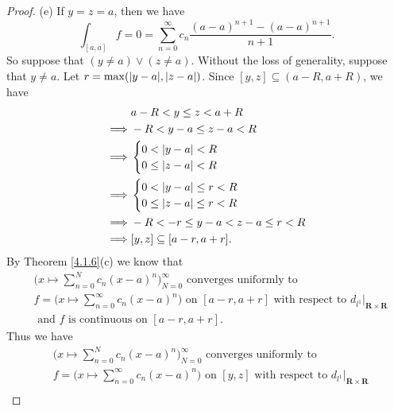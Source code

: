 \begin{proof}{(e)}
    If \(y = z = a\), then we have
    \[
        \int_{[a, a]} f = 0 = \sum_{n = 0}^\infty c_n \frac{(a - a)^{n + 1} - (a - a)^{n + 1}}{n + 1}.
    \]
    So suppose that \((y \neq a) \lor (z \neq a)\).
    Without the loss of generality, suppose that \(y \neq a\).
    Let \(r = \max(\abs*{y - a}, \abs*{z - a})\).
    Since \([y, z] \subseteq (a - R, a + R)\), we have
    \begin{align*}
                 & a - R < y \leq z < a + R              \\
        \implies & -R < y - a \leq z - a < R             \\
        \implies & \begin{cases}
                       0 < \abs*{y - a} < R \\
                       0 \leq \abs*{z - a} < R
                   \end{cases}                \\
        \implies & \begin{cases}
                       0 < \abs*{y - a} \leq r < R \\
                       0 \leq \abs*{z - a} \leq r < R
                   \end{cases}         \\
        \implies & -R < -r \leq y - a < z - a \leq r < R \\
        \implies & [y, z] \subseteq [a - r, a + r].
    \end{align*}
    By Theorem \ref{4.1.6}(c) we know that
    \begin{align*}
         & \bigg(x \mapsto \sum_{n = 0}^N c_n (x - a)^n\bigg)_{N = 0}^\infty \text{ converges uniformly to }                                                       \\
         & f = \bigg(x \mapsto \sum_{n = 0}^\infty c_n (x - a)^n\bigg) \text{ on } [a - r, a + r] \text{ with respect to } d_{l^1}|_{\mathbf{R} \times \mathbf{R}} \\
         & \text{ and } f \text{ is continuous on } [a - r, a + r].
    \end{align*}
    Thus we have
    \begin{align*}
         & \bigg(x \mapsto \sum_{n = 0}^N c_n (x - a)^n\bigg)_{N = 0}^\infty \text{ converges uniformly to }                                               \\
         & f = \bigg(x \mapsto \sum_{n = 0}^\infty c_n (x - a)^n\bigg) \text{ on } [y, z] \text{ with respect to } d_{l^1}|_{\mathbf{R} \times \mathbf{R}} \\

\end{align*}
\end{proof}
